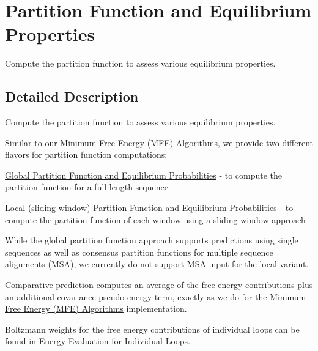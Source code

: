 \hypertarget{group__pf__fold}{}\section{Partition Function and Equilibrium Properties}
\label{group__pf__fold}


Compute the partition function to assess various equilibrium properties.  




\subsection{Detailed Description}
Compute the partition function to assess various equilibrium properties. 

Similar to our \hyperlink{group__mfe}{Minimum Free Energy (M\+FE) Algorithms}, we provide two different flavors for partition function computations\+:
\begin{DoxyItemize}
\item \hyperlink{group__part__func__global}{Global Partition Function and Equilibrium Probabilities} -\/ to compute the partition function for a full length sequence
\item \hyperlink{group__part__func__window}{Local (sliding window) Partition Function and Equilibrium Probabilities} -\/ to compute the partition function of each window using a sliding window approach
\end{DoxyItemize}

While the global partition function approach supports predictions using single sequences as well as consensus partition functions for multiple sequence alignments (M\+SA), we currently do not support M\+SA input for the local variant.

Comparative prediction computes an average of the free energy contributions plus an additional covariance pseudo-\/energy term, exactly as we do for the \hyperlink{group__mfe}{Minimum Free Energy (M\+FE) Algorithms} implementation.

Boltzmann weights for the free energy contributions of individual loops can be found in \hyperlink{group__eval__loops}{Energy Evaluation for Individual Loops}.

